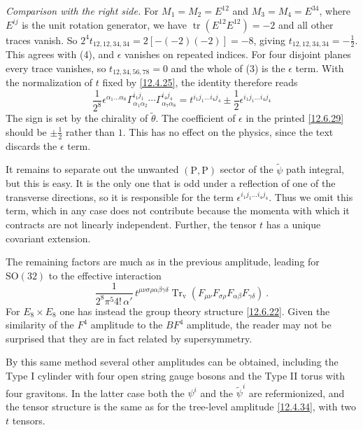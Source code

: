 \begin{tcolorbox}[breakable]
\begin{remark}
		\emph{Comparison with the right side.} For $M_{1}=M_{2}=E^{12}$ and $M_{3}=M_{4}=E^{34}$, where $E^{ij}$ is the unit rotation generator, we have $\operatorname{tr}(E^{12}E^{12})=-2$ and all other traces vanish. So $2^{4}t_{12,12,34,34}=2[-(-2)(-2)]=-8$, giving $t_{12,12,34,34}=-\frac12$. This agrees with (4), and $\epsilon$ vanishes on repeated indices. For four disjoint planes every trace vanishes, so $t_{12,34,56,78}=0$ and the whole of (3) is the $\epsilon$ term. With the normalization of $t$ fixed by \eqref{12.4.25}, the identity therefore reads
		\[
		\boxed{\;\frac{1}{2^{8}}\epsilon^{\alpha_{1}\dots\alpha_{8}}\Gamma^{i_{1}j_{1}}_{\alpha_{1}\alpha_{2}}\cdots\Gamma^{i_{4}j_{4}}_{\alpha_{7}\alpha_{8}}=t^{i_{1}j_{1}\dots i_{4}j_{4}}\pm\frac12\epsilon^{i_{1}j_{1}\dots i_{4}j_{4}}\;}
		\]
		The sign is set by the chirality of $\tilde\theta$. The coefficient of $\epsilon$ in the printed \eqref{12.6.29} should be $\pm\frac12$ rather than $1$. This has no effect on the physics, since the text discards the $\epsilon$ term.
	\end{remark}
\end{tcolorbox}

It remains to separate out the unwanted $(\mathrm{P},\mathrm{P})$ sector of the $\tilde{\psi}$ path integral, but this is easy. It is the only one that is odd under a reflection of one of the transverse directions, so it is responsible for the term $\epsilon^{i_1 j_1\dots i_4 j_4}$. Thus we omit this term, which in any case does not contribute because the momenta with which it contracts are not linearly independent. Further, the tensor $t$ has a unique covariant extension.

The remaining factors are much as in the previous amplitude, leading for $\mathrm{SO}(32)$ to the effective interaction
\begin{equation}
	\frac{1}{2^8\pi^5 4!\,\alpha'}\,t^{\mu\nu\sigma\rho\alpha\beta\gamma\delta}\operatorname{Tr}_{\mathrm{v}}(F_{\mu\nu}F_{\sigma\rho}F_{\alpha\beta}F_{\gamma\delta}) \:. \label{12.6.30}
\end{equation}
For $E_8\times E_8$ one has instead the group theory structure \eqref{12.6.22}. Given the similarity of the $F^4$ amplitude to the $BF^4$ amplitude, the reader may not be surprised that they are in fact related by supersymmetry.

By this same method several other amplitudes can be obtained, including the Type I cylinder with four open string gauge bosons and the Type II torus with four gravitons. In the latter case both the $\psi^i$ and the $\tilde{\psi}^i$ are refermionized, and the tensor structure is the same as for the tree-level amplitude \eqref{12.4.34}, with two $t$ tensors.

